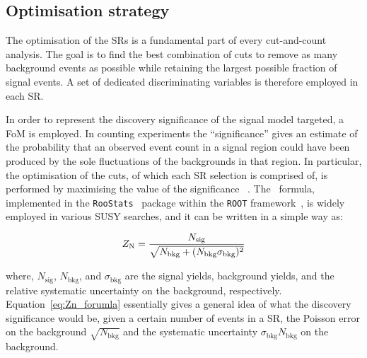 		\subsection{Optimisation strategy}

			The optimisation of the \acp{SR} is a fundamental part of every cut-and-count analysis. The goal is to find the best combination of cuts to remove as many background events as possible while retaining the largest possible fraction of signal events. A set of dedicated discriminating variables is therefore employed in each \ac{SR}.

			In order to represent the discovery significance of the signal model targeted, a \ac{FoM} is employed. In counting experiments the ``significance'' gives an estimate of the probability that an observed event count in a signal region could have been produced by the sole fluctuations of the backgrounds in that region. In particular, the optimisation of the cuts, of which each \ac{SR} selection is comprised of, is performed by maximising the value of the significance \Zn~\cite{Zn}. The \Zn\ formula, implemented in the \verb+RooStats+~\cite{2010acat.confE..57M} package within the \verb+ROOT+ framework~\cite{Brun:1997pa}, is widely employed in various \ac{SUSY} searches, and it can be written in a simple way as: 

			\begin{equation}
				Z_\mathrm{N} = \frac{N_\mathrm{sig}}{\sqrt{ N_\mathrm{bkg} + (N_\mathrm{bkg}\sigma_\mathrm{bkg})^2}}
				\label{eq:Zn_forumla}
			\end{equation} 

			\noindent where, $N_\mathrm{sig}$, $N_\mathrm{bkg}$, and $\sigma_\mathrm{bkg}$ are the signal yields, background yields, and the relative systematic uncertainty on the background, respectively. %
			Equation~\ref{eq:Zn_forumla} essentially gives a general idea of what the discovery significance would be, given a certain number of events in a \ac{SR}, the Poisson error on the background $\sqrt{N_{\mathrm{bkg}}}$ and the systematic uncertainty $\sigma_{\mathrm{bkg}} N_{\mathrm{bkg}}$ on the background. %

